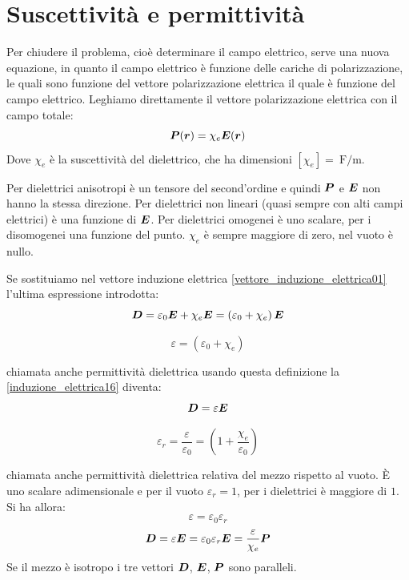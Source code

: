 \section{Suscettività e permittività}
Per chiudere il problema, cioè determinare il campo elettrico, serve una nuova equazione, in quanto il campo elettrico è funzione delle cariche di polarizzazione, le quali sono funzione del vettore polarizzazione elettrica il quale è funzione del campo elettrico. Leghiamo direttamente il vettore polarizzazione elettrica con il campo totale:
\begin{equation}
  \boldsymbol{P}(\boldsymbol{r})=\chi_e\boldsymbol{E}(\boldsymbol{r})
\end{equation}
Dove $\chi_e$ è la suscettività del dielettrico, che ha dimensioni \(  [\chi_e] = \SI{}{\farad\per\meter} \).

Per dielettrici anisotropi è un tensore del second'ordine e quindi $\boldsymbol{P}$ e $\boldsymbol{E}$ non hanno la stessa direzione. Per dielettrici non lineari (quasi sempre con alti campi elettrici) è una funzione di $\boldsymbol{E}$. Per dielettrici omogenei è uno scalare, per i disomogenei una funzione del punto. $\chi_e$ è sempre maggiore di zero, nel vuoto è nullo.

Se sostituiamo nel vettore induzione elettrica \eqref{vettore_induzione_elettrica01} l'ultima espressione introdotta:
\begin{equation}
  \boldsymbol{D}=\varepsilon_0\boldsymbol{E}+\chi_e\boldsymbol{E}=\left(\varepsilon_0+\chi_e\right)\boldsymbol{E}
  \label{induzione_elettrica16}
\end{equation}
\begin{Def}
  \begin{equation}
    \varepsilon=\left(\varepsilon_0+\chi_e\right)
  \end{equation}
\end{Def}
chiamata anche permittività dielettrica
usando questa definizione la \eqref{induzione_elettrica16} diventa:
\begin{equation}
  \boldsymbol{D}=\varepsilon\boldsymbol{E}
\end{equation}
\begin{Def}
  \begin{equation}
    \varepsilon_r=\frac{\varepsilon}{\varepsilon_0}=\left(1+\frac{\chi_e}{\varepsilon_0}\right)
  \end{equation}
\end{Def}
chiamata anche permittività dielettrica relativa del mezzo rispetto al vuoto. \`E uno scalare adimensionale e per il vuoto $\varepsilon_r=1$, per i dielettrici è maggiore di $1$. Si ha allora:
\begin{equation}
  \varepsilon=\varepsilon_0\varepsilon_r
\end{equation}
\begin{equation}
  \boldsymbol{D}=\varepsilon\boldsymbol{E}=\varepsilon_0\varepsilon_r\boldsymbol{E}=\frac{\varepsilon}{\chi_e}\boldsymbol{P}
\end{equation}
Se il mezzo è isotropo i tre vettori $\boldsymbol{D}$, $\boldsymbol{E}$, $\boldsymbol{P}$ sono paralleli.

